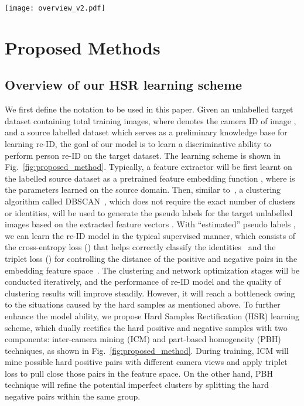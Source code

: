 \begin{figure*}[t!]
	\centering
    \texttt{[image: overview\_v2.pdf]}
    \label{fig:proposed_method}
    \vspace{-6mm}
\end{figure*}

\vspace{-5mm}
\section{Proposed Methods}
\vspace{-3mm}
\subsection{Overview of our HSR learning scheme} 
\label{sub:overview}
\vspace{-2mm}
We first define the notation to be used in this paper. Given an unlabelled target dataset  containing total  training images, where  denotes the camera ID of image , and a source labelled dataset which serves as a preliminary knowledge base for learning re-ID, the goal of our model is to learn a discriminative ability to perform person re-ID on the target dataset. 
The learning scheme is shown in Fig.~\ref{fig:proposed_method}. Typically, a feature extractor  will be first learnt on the labelled source dataset as a pretrained feature embedding function , where  is the parameters learned on the source domain. 
Then, similar to~\cite{SSG,PAST}, a clustering algorithm called DBSCAN~\cite{DBSCAN}, which does not require the exact number of clusters or identities, will be used to generate the pseudo labels for the target unlabelled images based on the extracted feature vectors .
With ``estimated'' pseudo labels , we can learn the re-ID model in the typical supervised manner, which consists of the cross-entropy loss () that helps correctly classify the identities~\cite{softmax} and the triplet loss () for controlling the distance of the positive and negative pairs in the embedding feature space~\cite{triplet}.
The clustering and network optimization stages will be conducted iteratively, and the performance of re-ID model and the quality of clustering results will improve steadily.
However, it will reach a bottleneck owing to the situations caused by the hard samples as mentioned above.
To further enhance the model ability, we propose Hard Samples Rectification (HSR) learning scheme, which dually rectifies the hard positive and negative samples with two components: inter-camera mining (ICM) and part-based homogeneity (PBH) techniques, as shown in Fig.~\ref{fig:proposed_method}.
During training, ICM will mine possible hard positive pairs with different camera views and apply triplet loss to pull close those pairs in the feature space. On the other hand, PBH technique will refine the potential imperfect clusters by splitting the hard negative pairs within the same group.

